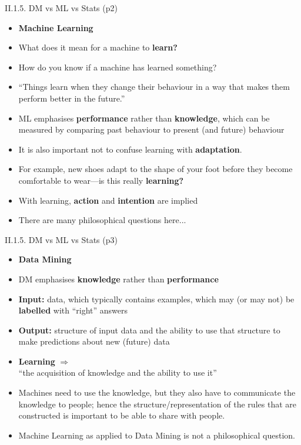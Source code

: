 \documentclass[handout]{beamer}
\newcommand{\strong}[1]{\textbf{\color{teal} #1}}
\newcommand{\stronger}[1]{\textbf{\color{purple} #1}}
\begin{document}
\begin{frame}{II.1.5. DM vs ML vs Stats (p2)}
\begin{itemize}
\item[] \stronger{Machine Learning}
\item What does it mean for a machine to \strong{learn?}
\item How do you know if a machine has learned something?
\item ``Things learn when they change their behaviour in a way that makes them perform better in the future.''~\cite[p7]{WFH3:2011}
\item ML emphasises \strong{performance} rather than \strong{knowledge},
which can be measured by comparing past behaviour to present (and future) behaviour
\item It is also important not to confuse learning with \strong{adaptation}.\\
\item[] For example, new shoes adapt to the shape of your foot before they become comfortable to wear---is this really \strong{learning?}
\item With learning, \strong{action} and \strong{intention} are implied
\item There are many philosophical questions here...
\end{itemize}
\end{frame}
\begin{frame}{II.1.5. DM vs ML vs Stats (p3)}
\begin{itemize}
\item[] \stronger{Data Mining}
\item DM emphasises \strong{knowledge} rather than \strong{performance}
\item \strong{Input:} data, which typically contains examples, which may (or may not) be \strong{labelled} with ``right'' answers
\item \strong{Output:} structure of input data and the ability to use that structure to make predictions about new (future) data
\item \strong{Learning} $\Rightarrow$\\
 ``the acquisition of knowledge and the ability to use it''
\item Machines need to use the knowledge, but they also have to communicate the knowledge to people; hence the structure/representation of the rules that are constructed is important to be able to share with people.
\item Machine Learning as applied to Data Mining is not a philosophical question.
\end{itemize}
\end{frame}
\end{document}
